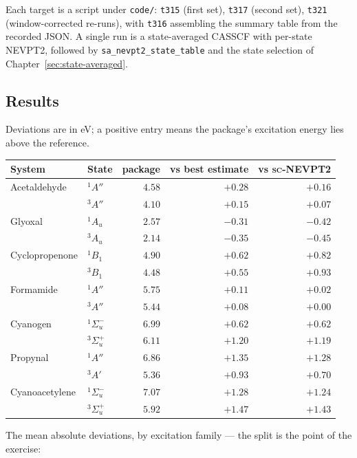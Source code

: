 Each target is a script under \texttt{code/}: \texttt{t315} (first
set), \texttt{t317} (second set), \texttt{t321} (window-corrected
re-runs), with \texttt{t316} assembling the summary table from the
recorded JSON.  A single run is a state-averaged
CASSCF with per-state NEVPT2, followed by
\texttt{sa\_nevpt2\_state\_table} and the state selection of
Chapter~\ref{sec:state-averaged}.

\subsection{Results}

Deviations are in eV; a positive entry means the package's excitation
energy lies above the reference.

\begin{center}
\begin{tabular}{llrrr}
\toprule
System & State & package & vs best estimate & vs \textsc{sc}-NEVPT2 \\
\midrule
Acetaldehyde & $^1A''$ & $4.58$ & $+0.28$ & $+0.16$ \\
             & $^3A''$ & $4.10$ & $+0.15$ & $+0.07$ \\
Glyoxal      & $^1A_u$ & $2.57$ & $-0.31$ & $-0.42$ \\
             & $^3A_u$ & $2.14$ & $-0.35$ & $-0.45$ \\
Cyclopropenone & $^1B_1$ & $4.90$ & $+0.62$ & $+0.82$ \\
               & $^3B_1$ & $4.48$ & $+0.55$ & $+0.93$ \\
Formamide    & $^1A''$ & $5.75$ & $+0.11$ & $+0.02$ \\
             & $^3A''$ & $5.44$ & $+0.08$ & $+0.00$ \\
Cyanogen     & $^1\Sigma_u^-$ & $6.99$ & $+0.62$ & $+0.62$ \\
             & $^3\Sigma_u^+$ & $6.11$ & $+1.20$ & $+1.19$ \\
Propynal     & $^1A''$ & $6.86$ & $+1.35$ & $+1.28$ \\
             & $^3A'$  & $5.36$ & $+0.93$ & $+0.70$ \\
Cyanoacetylene & $^1\Sigma_u^-$ & $7.07$ & $+1.28$ & $+1.24$ \\
               & $^3\Sigma_u^+$ & $5.92$ & $+1.47$ & $+1.43$ \\
\bottomrule
\end{tabular}
\end{center}

The mean absolute deviations, by excitation family --- the split is the
point of the exercise:

